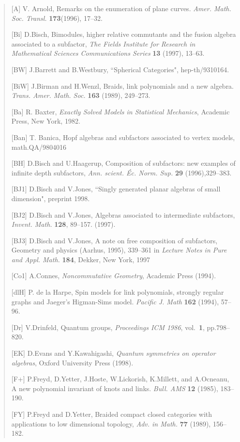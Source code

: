 \begin{verse}
[A] V. Arnold, Remarks on the enumeration of plane curves.
{\it Amer. Math. Soc. Transl.} {\bf 173}(1996), 17--32.

[Bi] D.Bisch, Bimodules, higher relative commutants and the fusion algebra associated
to a subfactor,
{\it The Fields Institute for Research in Mathematical 
Sciences Communications Series} {\bf 13} (1997), 13--63.
 
[BW] J.Barrett and B.Westbury, ``Spherical Categories", hep-th/9310164.

[BiW] J.Birman and H.Wenzl, Braids, link polynomials and a new algebra.
{\it Trans. Amer. Math. Soc.} {\bf 163} (1989), 249--273.

[Ba] R. Baxter, {\it Exactly Solved Models in Statistical
Mechanics},   Academic Press, New York, 1982.

[Ban] T. Banica, Hopf algebras and subfactors associated to vertex models,
math.QA/9804016

[BH] D.Bisch and U.Haagerup, Composition of subfactors: new examples of infinite depth subfactors,
{\it Ann. scient. {\'E}c. Norm. Sup.} {\bf 29} (1996),329--383.

[BJ1] D.Bisch and V.Jones, ``Singly generated planar
algebras of small dimension",  preprint 1998.

[BJ2] D.Bisch and V.Jones, Algebras associated to
intermediate subfactors, {\it Invent. Math.} {\bf 128}, 89--157.
(1997).


[BJ3] D.Bisch and V.Jones, A note on free composition of
subfactors, Geometry and physics
 (Aarhus, 1995), 339--361 in {\it Lecture Notes in Pure and Appl.
Math.} {\bf 184}, Dekker, New York, 1997


[Co1] A.Connes, {\it Noncommutative Geometry}, Academic
Press (1994).

[dlH] P. de la Harpe,
Spin models for link polynomials, strongly regular graphs and Jaeger's Higman-Sims model.
{\it Pacific J. Math} {\bf 162}
(1994), 57--96.

[Dr] V.Drinfeld, Quantum groups, {\it Proceedings ICM
1986}, vol.~{\bf 1}, pp.798--820.


[EK] D.Evans and Y.Kawahigashi, {\it Quantum symmetries on operator algebras},
Oxford University Press (1998).

[F+] P.Freyd, D.Yetter, J.Hoste, W.Lickorish, K.Millett,
and A.Ocneanu, A new polynomial invariant of knots and links.
{\it Bull. AMS} {\bf 12} (1985), 183--190.


[FY] P.Freyd and D.Yetter,
 Braided compact closed categories with applications to low
dimensional topology, {\it Adv. in Math.} {\bf 77}
(1989), 156--182.



\end{verse}
